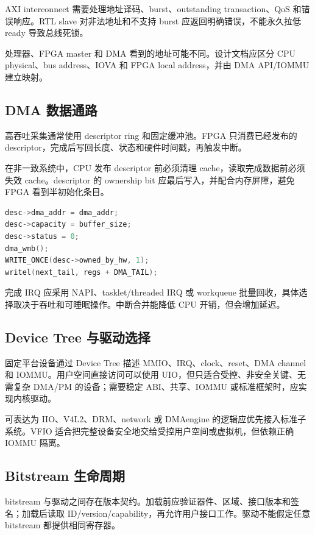 AXI interconnect 需要处理地址译码、burst、outstanding transaction、QoS 和错误响应。RTL slave 对非法地址和不支持 burst 应返回明确错误，不能永久拉低 ready 导致总线死锁。

处理器、FPGA master 和 DMA 看到的地址可能不同。设计文档应区分 CPU physical、bus address、IOVA 和 FPGA local address，并由 DMA API/IOMMU 建立映射。

\subsection{DMA 数据通路}

高吞吐采集通常使用 descriptor ring 和固定缓冲池。FPGA 只消费已经发布的 descriptor，完成后写回长度、状态和硬件时间戳，再触发中断。

在非一致系统中，CPU 发布 descriptor 前必须清理 cache，读取完成数据前必须失效 cache。descriptor 的 ownership bit 应最后写入，并配合内存屏障，避免 FPGA 看到半初始化条目。

\begin{lstlisting}[language=C,caption={DMA descriptor 所有权交接（伪代码）}]
desc->dma_addr = dma_addr;
desc->capacity = buffer_size;
desc->status = 0;
dma_wmb();
WRITE_ONCE(desc->owned_by_hw, 1);
writel(next_tail, regs + DMA_TAIL);
\end{lstlisting}

完成 IRQ 应采用 NAPI、tasklet/threaded IRQ 或 workqueue 批量回收，具体选择取决于吞吐和可睡眠操作。中断合并能降低 CPU 开销，但会增加延迟。

\subsection{Device Tree 与驱动选择}

固定平台设备通过 Device Tree 描述 MMIO、IRQ、clock、reset、DMA channel 和 IOMMU。用户空间直接访问可以使用 UIO，但只适合受控、非安全关键、无需复杂 DMA/PM 的设备；需要稳定 ABI、共享、IOMMU 或标准框架时，应实现内核驱动。

可表达为 IIO、V4L2、DRM、network 或 DMAengine 的逻辑应优先接入标准子系统。VFIO 适合把完整设备安全地交给受控用户空间或虚拟机，但依赖正确 IOMMU 隔离。

\subsection{Bitstream 生命周期}

bitstream 与驱动之间存在版本契约。加载前应验证器件、区域、接口版本和签名；加载后读取 ID/version/capability，再允许用户接口工作。驱动不能假定任意 bitstream 都提供相同寄存器。

